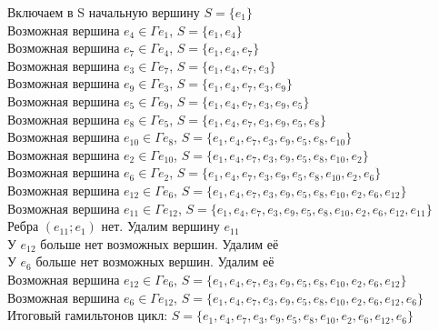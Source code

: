 \documentclass[a4paper,12pt]{article}
\begin{document}
\pagebreak
\noindent
\begin{samepage}
    Включаем в S начальную вершину $S=\{e_1\}$\\
    \textquotedbl Возможная\textquotedbl{} вершина $e_{4}\in\Gamma e_{1}$, $S=\{e_{1},e_{4}\}$\\
    \textquotedbl Возможная\textquotedbl{} вершина $e_{7}\in\Gamma e_{4}$, $S=\{e_{1},e_{4},e_{7}\}$\\
    \textquotedbl Возможная\textquotedbl{} вершина $e_{3}\in\Gamma e_{7}$, $S=\{e_{1},e_{4},e_{7},e_{3}\}$\\
    \textquotedbl Возможная\textquotedbl{} вершина $e_{9}\in\Gamma e_{3}$, $S=\{e_{1},e_{4},e_{7},e_{3},e_{9}\}$\\
    \textquotedbl Возможная\textquotedbl{} вершина $e_{5}\in\Gamma e_{9}$, $S=\{e_{1},e_{4},e_{7},e_{3},e_{9},e_{5}\}$\\
    \textquotedbl Возможная\textquotedbl{} вершина $e_{8}\in\Gamma e_{5}$, $S=\{e_{1},e_{4},e_{7},e_{3},e_{9},e_{5},e_{8}\}$\\
    \textquotedbl Возможная\textquotedbl{} вершина $e_{10}\in\Gamma e_{8}$, $S=\{e_{1},e_{4},e_{7},e_{3},e_{9},e_{5},e_{8},e_{10}\}$\\
    \textquotedbl Возможная\textquotedbl{} вершина $e_{2}\in\Gamma e_{10}$, $S=\{e_{1},e_{4},e_{7},e_{3},e_{9},e_{5},e_{8},e_{10},e_{2}\}$\\
    \textquotedbl Возможная\textquotedbl{} вершина $e_{6}\in\Gamma e_{2}$, $S=\{e_{1},e_{4},e_{7},e_{3},e_{9},e_{5},e_{8},e_{10},e_{2},e_{6}\}$\\
    \textquotedbl Возможная\textquotedbl{} вершина $e_{12}\in\Gamma e_{6}$, $S=\{e_{1},e_{4},e_{7},e_{3},e_{9},e_{5},e_{8},e_{10},e_{2},e_{6},e_{12}\}$\\
    \textquotedbl Возможная\textquotedbl{} вершина $e_{11}\in\Gamma e_{12}$, $S=\{e_{1},e_{4},e_{7},e_{3},e_{9},e_{5},e_{8},e_{10},e_{2},e_{6},e_{12},e_{11}\}$\\
    Ребра $(e_{11};e_{1})$ нет. Удалим вершину $e_{11}$\\
    У $e_{12}$ больше нет \textquotedbl возможных\textquotedbl{} вершин. Удалим её\\
    У $e_{6}$ больше нет \textquotedbl возможных\textquotedbl{} вершин. Удалим её\\
    \textquotedbl Возможная\textquotedbl{} вершина $e_{12}\in\Gamma e_{6}$, $S=\{e_{1},e_{4},e_{7},e_{3},e_{9},e_{5},e_{8},e_{10},e_{2},e_{6},e_{12}\}$\\
    \textquotedbl Возможная\textquotedbl{} вершина $e_{6}\in\Gamma e_{12}$, $S=\{e_{1},e_{4},e_{7},e_{3},e_{9},e_{5},e_{8},e_{10},e_{2},e_{6},e_{12},e_{6}\}$\\
    Итоговый гамильтонов цикл: $S=\{e_{1},e_{4},e_{7},e_{3},e_{9},e_{5},e_{8},e_{10},e_{2},e_{6},e_{12},e_{6}\}$\\
\end{samepage}
\end{document}
